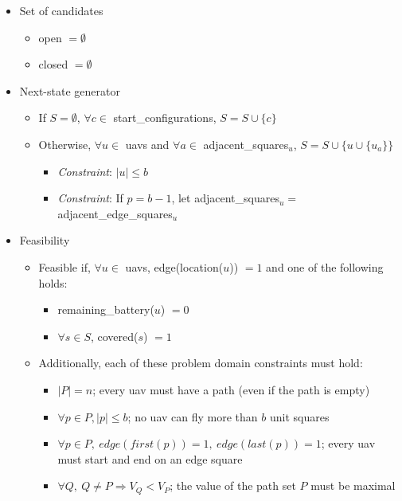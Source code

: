 \documentclass[../main.tex]{subfiles}
\begin{document}
\begin{itemize}
    \item Set of candidates
    \begin{itemize}
        \item open $=\emptyset$
        \item closed $=\emptyset$
    \end{itemize}
    
    \item Next-state generator
    \begin{itemize}
        \item If $S=\emptyset$, $\forall c\in$ start\_configurations, $S=S\cup \{c\}$
        \item Otherwise, $\forall u\in$ \acp{uav} and $\forall a\in$ adjacent\_squares$_u$, $S=S\cup \{u\cup \{u_a\}\}$
        \begin{itemize}
            \item \textit{Constraint}: $|u|\leq b$
            \item \textit{Constraint}: If $p=b-1$, let adjacent\_squares$_u=$ adjacent\_edge\_squares$_u$
        \end{itemize}
    \end{itemize}
    
    \item Feasibility
    \begin{itemize}
        \item Feasible if, $\forall u\in$ \acp{uav}, edge(location($u$)) $=1$ and one of the following holds:
        \begin{itemize} 
            \item remaining\_battery($u$) $=0$
            \item $\forall s\in S$, covered($s$) $=1$
        \end{itemize}

        \item Additionally, each of these problem domain constraints must hold:
        \begin{itemize}
            \item $|P|=n$; every \ac{uav} must have a path (even if the path is empty)
            \item $\forall p\in P, |p|\leq b$; no \ac{uav} can fly more than $b$ unit squares
            \item $\forall p\in P, \ edge(first(p)) = 1, \ edge(last(p)) = 1$; every \ac{uav} must start and end on an edge square
            \item $\forall Q, \ Q\neq P \Rightarrow V_Q<V_P$; the value of the path set $P$ must be maximal
        \end{itemize}
    \end{itemize}


\end{itemize}
\end{document}
